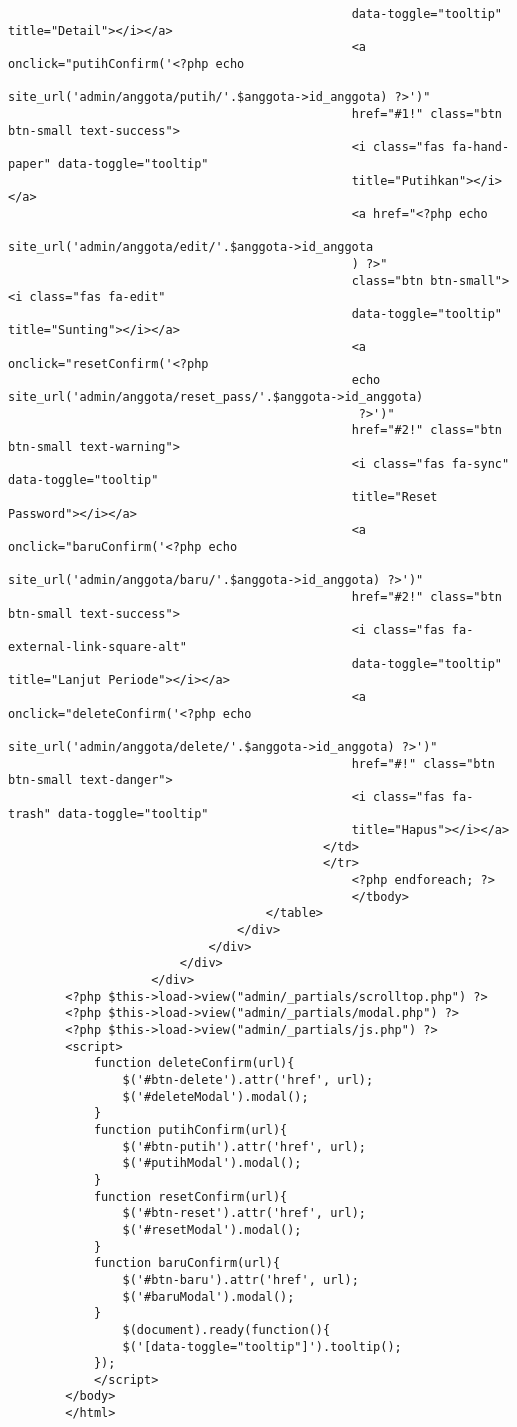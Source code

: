 \begin{verbatim}
												data-toggle="tooltip" title="Detail"></i></a>
												<a onclick="putihConfirm('<?php echo 
												site_url('admin/anggota/putih/'.$anggota->id_anggota) ?>')"
												href="#1!" class="btn btn-small text-success">
												<i class="fas fa-hand-paper" data-toggle="tooltip" 
												title="Putihkan"></i></a>
												<a href="<?php echo 
												site_url('admin/anggota/edit/'.$anggota->id_anggota
												) ?>"
												class="btn btn-small"><i class="fas fa-edit" 
												data-toggle="tooltip" title="Sunting"></i></a>
												<a onclick="resetConfirm('<?php 
												echo site_url('admin/anggota/reset_pass/'.$anggota->id_anggota)
												 ?>')"
												href="#2!" class="btn btn-small text-warning">
												<i class="fas fa-sync" data-toggle="tooltip" 
												title="Reset Password"></i></a>
												<a onclick="baruConfirm('<?php echo 
												site_url('admin/anggota/baru/'.$anggota->id_anggota) ?>')"
												href="#2!" class="btn btn-small text-success">
												<i class="fas fa-external-link-square-alt" 
												data-toggle="tooltip" title="Lanjut Periode"></i></a>
												<a onclick="deleteConfirm('<?php echo 
												site_url('admin/anggota/delete/'.$anggota->id_anggota) ?>')"
												href="#!" class="btn btn-small text-danger">
												<i class="fas fa-trash" data-toggle="tooltip" 
												title="Hapus"></i></a>
											</td>
											</tr>
												<?php endforeach; ?>
												</tbody>
									</table>
								</div>
							</div>
						</div>		
					</div>
		<?php $this->load->view("admin/_partials/scrolltop.php") ?>
		<?php $this->load->view("admin/_partials/modal.php") ?>
		<?php $this->load->view("admin/_partials/js.php") ?>
		<script>
			function deleteConfirm(url){
				$('#btn-delete').attr('href', url);
				$('#deleteModal').modal();
			}
			function putihConfirm(url){
				$('#btn-putih').attr('href', url);
				$('#putihModal').modal();
			}
			function resetConfirm(url){
				$('#btn-reset').attr('href', url);
				$('#resetModal').modal();
			}
			function baruConfirm(url){
				$('#btn-baru').attr('href', url);
				$('#baruModal').modal();
			}
				$(document).ready(function(){
				$('[data-toggle="tooltip"]').tooltip();
			});
			</script>		
		</body>		
		</html>		
\end{verbatim}
